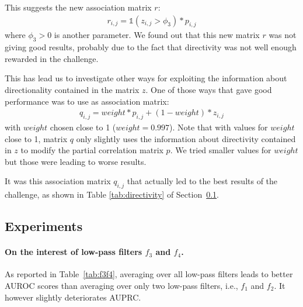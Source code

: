 \documentclass[wcp]{jmlr}
\begin{document}
This suggests the new association matrix $r$:
\begin{align}
r_{i,j} =  \mathbb{1}(z_{i,j} > \phi_3)  *  p_{i,j}
\end{align}
where $\phi_3 >0$ is another parameter. We found out that this new
matrix $r$ was not giving good results, probably due to the fact that
directivity was not well enough rewarded in the challenge. 

This has lead us to investigate other ways for exploiting the
information about directionality contained in the matrix $z$. One of
those ways that gave good performance was to use as association
matrix: 
\begin{align}
q_{i,j} = weight * p_{i,j} + (1-weight) * z_{i,j}
\end{align}
with  $weight$ chosen close to 1 ($weight=0.997$). Note that with
values for $weight$ close to 1,   matrix $q$ only slightly uses the
information about directivity contained in $z$ to modify the  partial
correlation matrix $p$. We tried smaller values for $weight$ but those
were leading to worse results. 

It was  this association matrix $q_{i,j}$ that actually led to the
best results of the challenge, as shown in Table \ref{tab:directivity}
of Section~\ref{sapp:results}.

\subsection{Experiments}
\label{sapp:results}

\paragraph{On the interest of low-pass filters $f_3$ and $f_4$.}




As reported in Table~\ref{tab:f3f4}, averaging over all low-pass filters leads
to better AUROC scores than averaging over only two low-pass filters, i.e., $f_1$ and
$f_2$. It however slightly deteriorates AUPRC.
\end{document}
